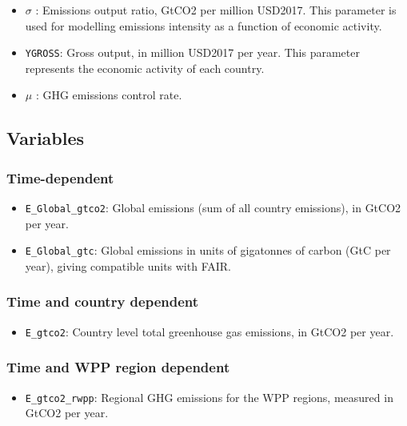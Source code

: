 \documentclass[
]{article}
\providecommand{\tightlist}{%
  \setlength{\itemsep}{0pt}\setlength{\parskip}{0pt}}
\begin{document}
\begin{itemize}
\item
  \(\sigma\) : Emissions output ratio, GtCO2 per million USD2017. This
  parameter is used for modelling emissions intensity as a function of
  economic activity.
\item
  \texttt{YGROSS}: Gross output, in million USD2017 per year. This
  parameter represents the economic activity of each country.
\item
  \(\mu\) : GHG emissions control rate.
\end{itemize}

\subsection{Variables}\label{variables-2}

\subsubsection{Time-dependent}\label{time-dependent-3}

\begin{itemize}
\item
  \texttt{E\_Global\_gtco2}: Global emissions (sum of all country
  emissions), in GtCO2 per year.
\item
  \texttt{E\_Global\_gtc}: Global emissions in units of gigatonnes of
  carbon (GtC per year), giving compatible units with FAIR.
\end{itemize}

\subsubsection{Time and country
dependent}\label{time-and-country-dependent-5}

\begin{itemize}
\tightlist
\item
  \texttt{E\_gtco2}: Country level total greenhouse gas emissions, in
  GtCO2 per year.
\end{itemize}

\subsubsection{Time and WPP region
dependent}\label{time-and-WPP-region-dependent}

\begin{itemize}
\tightlist
\item
  \texttt{E\_gtco2\_rwpp}: Regional GHG emissions for the WPP regions, measured in GtCO2 per year.
\end{itemize}
\end{document}
